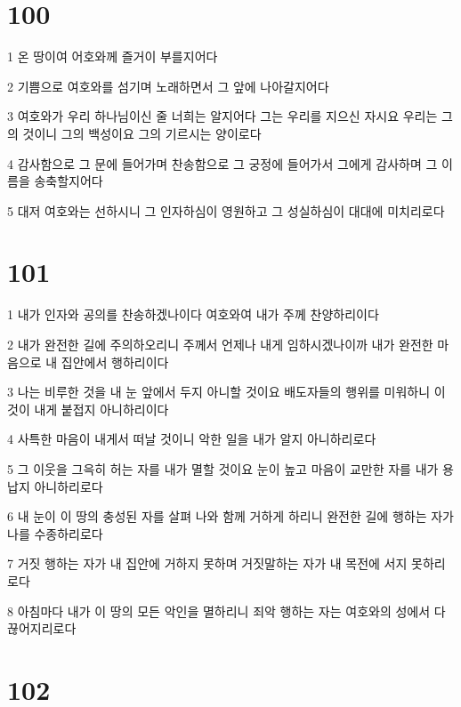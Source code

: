 \chapter{100}

\par 1 온 땅이여 어호와께 즐거이 부를지어다
\par 2 기쁨으로 여호와를 섬기며 노래하면서 그 앞에 나아갈지어다
\par 3 여호와가 우리 하나님이신 줄 너희는 알지어다 그는 우리를 지으신 자시요 우리는 그의 것이니 그의 백성이요 그의 기르시는 양이로다
\par 4 감사함으로 그 문에 들어가며 찬송함으로 그 궁정에 들어가서 그에게 감사하며 그 이름을 송축할지어다
\par 5 대저 여호와는 선하시니 그 인자하심이 영원하고 그 성실하심이 대대에 미치리로다

\chapter{101}

\par 1 내가 인자와 공의를 찬송하겠나이다 여호와여 내가 주께 찬양하리이다
\par 2 내가 완전한 길에 주의하오리니 주께서 언제나 내게 임하시겠나이까 내가 완전한 마음으로 내 집안에서 행하리이다
\par 3 나는 비루한 것을 내 눈 앞에서 두지 아니할 것이요 배도자들의 행위를 미워하니 이것이 내게 붙접지 아니하리이다
\par 4 사특한 마음이 내게서 떠날 것이니 악한 일을 내가 알지 아니하리로다
\par 5 그 이웃을 그윽히 허는 자를 내가 멸할 것이요 눈이 높고 마음이 교만한 자를 내가 용납지 아니하리로다
\par 6 내 눈이 이 땅의 충성된 자를 살펴 나와 함께 거하게 하리니 완전한 길에 행하는 자가 나를 수종하리로다
\par 7 거짓 행하는 자가 내 집안에 거하지 못하며 거짓말하는 자가 내 목전에 서지 못하리로다
\par 8 아침마다 내가 이 땅의 모든 악인을 멸하리니 죄악 행하는 자는 여호와의 성에서 다 끊어지리로다

\chapter{102}

